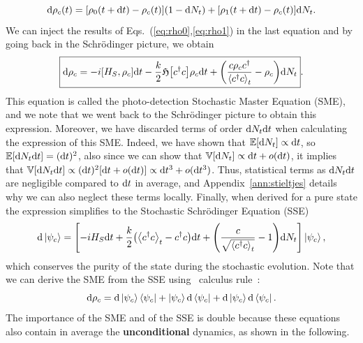 \begin{equation}\label{eq:SMEwrtdN}
    \mathrm{d}\rho_c(t)=\qty[\rho_0(t+\mathrm{d}t)-\rho_c(t)]\qty(1-\mathrm{d}N_t)+\qty[\rho_1(t+\mathrm{d}t)-\rho_c(t)]\mathrm{d}N_t.
\end{equation}
We can inject the results of Eqs.~(\ref{eq:rho0},\ref{eq:rho1}) in the last equation and by going back in the Schrödinger picture, we obtain
\begin{equation}\label{eq:SMEphotodet}
    \boxed{\mathrm{d}\rho_c=-i\qty[H_S,\rho_c]\mathrm{d}t-\frac{k}{2}\mathfrak{H}\qty[c^\dagger c]\rho_c\mathrm{d}t + \qty(\frac{c\rho_c c^\dagger}{\expval{c^\dagger c}_t}-\rho_c)\mathrm{d}N_t}.
\end{equation}
This equation is called the photo-detection Stochastic Master Equation (SME), and we note that we went back to the Schrödinger picture to obtain this expression. Moreover, we have discarded terms of order $\mathrm{d}N_t\mathrm{d}t$ when calculating the expression of this SME. Indeed, we have shown that $\mathbb{E}\qty[\mathrm{d}N_t]\propto\mathrm{d}t$, so $\mathbb{E}\qty[\mathrm{d}N_t\mathrm{d}t]=(\mathrm{d}t)^2$, also since we can show that $\mathbb{V}[\mathrm{d}N_t]\propto\mathrm{d}t+o(\mathrm{d}t)$, it implies that $\mathbb{V}[\mathrm{d}N_t\mathrm{d}t]\propto(\mathrm{d}t)^2\qty[\mathrm{d}t+o(\mathrm{d}t)]\propto\mathrm{d}t^3+o(\mathrm{d}t^3)$. Thus, statistical terms as $\mathrm{d}N_t\mathrm{d}t$ are negligible compared to $\mathrm{d}t$ in average, and Appendix~\ref{ann:stieltjes} details why we can also neglect these terms locally. Finally, when derived for a pure state the expression simplifies to the Stochastic Schrödinger Equation (SSE)
\begin{equation}
    \mathrm{d}\ket{\psi_c}=\qty[-iH_S\mathrm{d}t+\frac{k}{2}\qty(\expval{c^\dagger c}_t-c^\dagger c)\mathrm{d}t + \qty(\frac{c}{\sqrt{\expval{c^\dagger c}_t}}-1)\mathrm{d}N_t]\ket{\psi_c},
\end{equation}
which conserves the purity of the state during the stochastic evolution. Note that we can derive the SME from the SSE using \ito~calculus rule~\cite{Albarelli}:
\begin{equation}
    \mathrm{d}\rho_c=\mathrm{d}\ket{\psi_c}\bra{\psi_c}
    +\ket{\psi_c}\mathrm{d}\bra{\psi_c}
    +\mathrm{d}\ket{\psi_c}\mathrm{d}\bra{\psi_c}.
\end{equation}
The importance of the SME and of the SSE is double because these equations also contain in average the \textbf{unconditional} dynamics, as shown in the following.

